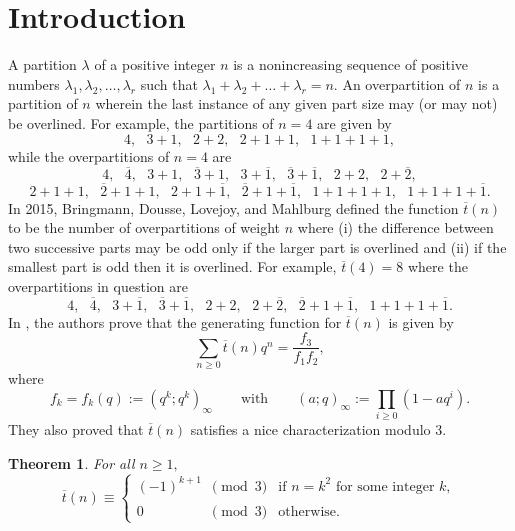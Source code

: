\documentclass{amsart}
\newtheorem{theorem}{Theorem}[section]
\theoremstyle{definition}
\newcommand{\tbar}{\overline{t}}
\begin{document}
\section{Introduction}\label{sec.intro}
A partition $\lambda$ of a positive integer $n$ is a nonincreasing sequence of positive numbers $\lambda_1, \lambda_2, \dots, \lambda_r$ such that $\lambda_1 + \lambda_2 + \dots + \lambda_r = n$.  An overpartition of $n$ is a partition of $n$ wherein the last instance of any given part size may (or may not) be overlined.  For example, the partitions of $n=4$ are given by 
$$
4, \ \ \ 3+1, \ \ \ 2+2, \ \ \ 2+1+1, \ \ \ 1+1+1+1,
$$
while the overpartitions of $n=4$ are 
$$
4, \ \ \ \overline{4}, \ \ \ 3+1, \ \ \ \overline{3}+1, \ \ \ 3 + \overline{1}, \ \ \ \overline{3}+\overline{1}, \ \ \ 2+2, \ \ \ 2+\overline{2}, 
$$
$$2+1+1, \ \ \ \overline{2}+1+1, \ \ \ 2 + 1+\overline{1}, \ \ \ \overline{2}+1+\overline{1}, \ \ \ 1+1+1+1, \ \ \ 1+1+1+\overline{1}.
$$
In 2015, Bringmann, Dousse, Lovejoy, and Mahlburg \cite{BDLM} defined the function $\overline{t}(n)$ to be the number of overpartitions of weight $n$ where (i) the difference between two successive parts may be odd only if the larger part is overlined and (ii) if the smallest part is odd then it is overlined.  For example, $\overline{t}(4)= 8$ where the overpartitions in question are   
$$4,  \ \ \  \overline{4}, \ \ \ 3+\overline{1}, \ \ \  \overline{3}+\overline{1},  \ \ \ 2+2,  \ \ \ 2+\overline{2},  \ \ \ \overline{2}+1+\overline{1},  \ \ \  1+1+1+\overline{1}.
$$ 
%
In \cite{BDLM}, the authors prove that the generating function for $\overline{t}(n)$ is given by 
\begin{equation}\label{generating}
\sum_{n\ge0}\tbar(n)q^{n}=\frac{f_3}{f_1f_2},
\end{equation}
where 
$$
f_k=f_k(q) :=(q^k;q^k)_\infty\qquad\text{with} \qquad(a;q)_\infty:=\prod\limits_{i\geq 0}(1-aq^{i}).
$$
They also proved that $\overline{t}(n)$ satisfies a nice characterization modulo 3.  
\begin{theorem}
\label{3characterization}
For all $n\geq 1,$ 
\begin{equation*}
\overline{t}(n) \equiv
\begin{cases} 
(-1)^{k+1}\phantom{0}  \pmod{3} & \mbox{if } n =k^2 \mbox{ for\ some\ integer\ } k, \\
0\phantom{(-1)^{k+1}} \pmod{3} & \mbox{otherwise. } 
\end{cases} 
\end{equation*}
\end{theorem}
\end{document}
